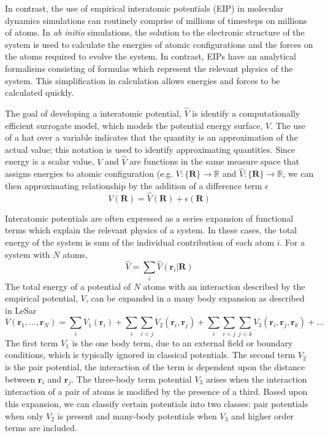 In contrast, the use of empirical interatomic potentials (EIP) in molecular dynamics simulations can routinely comprise of millions of timesteps on millions of atoms.  In \emph{ab initio} simulations, the solution to the electronic structure of the system is used to calculate the energies of atomic configurations and the forces on the atoms required to evolve the system. In contrast, EIPs have an analytical formalisms consisting of formulas which represent the relevant physics of the system.  This simplification in calculation allows energies and forces to be calculated quickly.

The goal of developing a interatomic potential, $\hat{V}$ is identify a computationally efficient surrogate model, which models the potential energy surface, $V$.  The use of a hat over a variable indicates that the quantity is an approximation of the actual value; this notation is used to identify approximating quantities.
Since energy is a scalar value, $V$ and $\hat{V}$ are functions in the same measure space that assigns energies to atomic configuration (e.g. ${V:\{\bm{R}\}\rightarrow \mathbb{R}}$ and ${\hat{V}:\{\bm{R}\} \rightarrow \mathbb{R}}$, we can then approximating relationship by the addition of a difference term $\epsilon$
\begin{equation}\label{eq:pes_approximation}
    V(\bm{R}) = \hat{V}(\bm{R}) + \epsilon(\bm{R})
\end{equation}

Interatomic potentials are often expressed as a series expansion of functional terms which explain the relevant physics of a system.  In these cases, the total energy of the system is sum of the individual contribution of each atom $i$.  For a system with $N$ atoms,
\begin{equation}
	\hat{V}= \sum_{i} \hat{V}(\bm{r}_i\vert\bm{R})
\end{equation}
The total energy of a potential of $N$ atoms with an interaction described by the empirical potential, $V$, can be expanded in a many body expansion as described in LeSar\cite{lesar2013_textbook}
\begin{equation}
	V(\bm{r}_1,...,\bm{r}_N)= \sum_i V_1(\bm{r}_i)
	        + \sum_i \sum_{i<j} V_2(\bm{r}_i,\bm{r}_j)
				  + \sum_i \sum_{i<j} \sum_{j<k} V_3(\bm{r}_i,\bm{r}_j,\bm{r}_k) + ...
\end{equation}
The first term $V_1$ is the one body term, due to an external field or boundary conditions, which is typically ignored in classical potentials.
The second term $V_2$ is the pair potential, the interaction of the term is dependent upon the distance between $\bm{r}_i$ and $\bm{r}_j$.
The three-body term potential $V_3$ arises when the interaction interaction of a pair of atoms is modified by the presence of a third.
Based upon this expansion, we can classify certain potentials into two classes: pair potentials when only $V_2$ is present and many-body potentials when $V_3$ and higher order terms are included.

